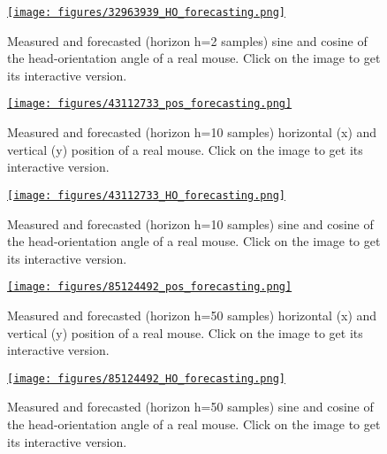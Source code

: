 \documentclass[12pt]{article}
\begin{document}
\begin{figure}
    \centering
    \href{https://www.gatsby.ucl.ac.uk/~rapela/aman/reports/ekfForKinematicsAndHeadOrientation/figures/32963939_HO_forecasting.html}{\texttt{[image: figures/32963939\_HO\_forecasting.png]}}
    \caption{Measured and forecasted (horizon h=2 samples) sine and cosine of
    the head-orientation angle of a real mouse. Click on the image to get
    its interactive version.}
    \label{fig:real_h2_HO}
\end{figure}

\begin{figure}
    \centering
    \href{https://www.gatsby.ucl.ac.uk/~rapela/aman/reports/ekfForKinematicsAndHeadOrientation/figures/43112733_pos_forecasting.html}{\texttt{[image: figures/43112733\_pos\_forecasting.png]}}
    \caption{Measured and forecasted (horizon h=10 samples) horizontal (x) and
    vertical (y) position of a real mouse. Click on the image to get its
    interactive version.}
    \label{fig:real_h10_pos}
\end{figure}

\begin{figure}
    \centering
    \href{https://www.gatsby.ucl.ac.uk/~rapela/aman/reports/ekfForKinematicsAndHeadOrientation/figures/43112733_HO_forecasting.html}{\texttt{[image: figures/43112733\_HO\_forecasting.png]}}
    \caption{Measured and forecasted (horizon h=10 samples) sine and cosine of
    the head-orientation angle of a real mouse. Click on the image to get
    its interactive version.}
    \label{fig:real_h10_HO}
\end{figure}

\begin{figure}
    \centering
    \href{https://www.gatsby.ucl.ac.uk/~rapela/aman/reports/ekfForKinematicsAndHeadOrientation/figures/85124492_pos_forecasting.html}{\texttt{[image: figures/85124492\_pos\_forecasting.png]}}
    \caption{Measured and forecasted (horizon h=50 samples) horizontal (x) and
    vertical (y) position of a real mouse. Click on the image to get its
    interactive version.}
    \label{fig:real_h50_pos}
\end{figure}

\begin{figure}
    \centering
    \href{https://www.gatsby.ucl.ac.uk/~rapela/aman/reports/ekfForKinematicsAndHeadOrientation/figures/85124492_HO_forecasting.html}{\texttt{[image: figures/85124492\_HO\_forecasting.png]}}
    \caption{Measured and forecasted (horizon h=50 samples) sine and cosine of
    the head-orientation angle of a real mouse. Click on the image to get
    its interactive version.}
    \label{fig:real_h50_HO}
\end{figure}
\end{document}
